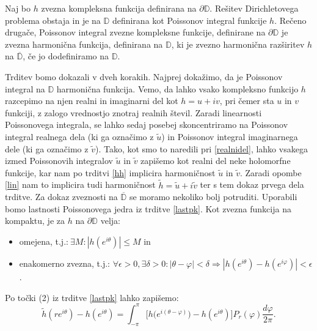 \documentclass[mat1]{fmfdelo}
\begin{document}
     \begin{trditev}
        \label{obstoj}
        Naj bo $h$ zvezna kompleksna funkcija definirana na $\partial \mathbb{D}$. Rešitev Dirichletovega problema obstaja in je na $\mathbb{D}$ definirana kot Poissonov integral funkcije $h$.
        \newline
        Rečeno drugače, Poissonov integral zvezne kompleksne funkcije, definirane na $\partial \mathbb{D}$ je zvezna harmonična funkcija, definirana na $\mathbb{D}$, ki je zvezno harmonična razširitev $h$ na $\overline{\mathbb{D}}$, če jo dodefiniramo na $\mathbb{D}$.
     \end{trditev}
     \begin{dokaz}
        Trditev bomo dokazali v dveh korakih. Najprej dokažimo, da je Poissonov integral na $\mathbb{D}$ harmonična funkcija.
        Vemo, da lahko vsako kompleksno funkcijo $h$ razcepimo na njen realni in imaginarni del kot $h = u + iv$, pri čemer sta $u$ in $v$ funkciji, z zalogo vrednostjo znotraj realnih števil. 
        Zaradi linearnosti Poissonovega integrala, se lahko sedaj posebej skoncentriramo na Poissonov integral realnega dela (ki ga označimo z $\widetilde{u}$) in Poissonov integral imaginarnega dele (ki ga označimo z $\widetilde{v}$). 
        Tako, kot smo to naredili pri \ref{realnidel}, lahko vsakega izmed Poissonovih integralov $\widetilde{u}$ in $\widetilde{v}$ zapišemo kot realni del neke holomorfne funkcije, kar nam po trditvi \ref{hh} implicira harmoničnost $\widetilde{u}$ in $\widetilde{v}$.
        Zaradi opombe \ref{lin} nam to implicira tudi harmoničnost $\widetilde{h} = \widetilde{u} + i\widetilde{v}$ ter s tem dokaz prvega dela trditve. 
        \newline
        Za dokaz zveznosti na $\overline{\mathbb{D}}$ se moramo nekoliko bolj potruditi. Uporabili bomo lastnosti Poissonovega jedra iz trditve \ref{lastpk}. 
        Kot zvezna funkcija na kompaktu, je za $h$ na $\partial \mathbb{D}$ velja: 
        \begin{itemize}
            \item omejena, t.j.:$~\exists M: |h(e^{i\theta})| \leq M$ in 
            \item enakomerno zvezna, t.j.: $\forall \epsilon > 0, \exists \delta > 0: | \theta - \varphi | < \delta \Rightarrow |h(e^{i\theta}) - h(e^{i\varphi})| < \epsilon $.
        \end{itemize}
        Po točki (2) iz trditve \ref{lastpk} lahko zapišemo:
        $$
            \widetilde{h}(re^{i\theta}) - h(e^{i\theta}) = \int_{-\pi}^{\pi}{\bigg[h\big(e^{i(\theta - \varphi)}\big) - h(e^{i\theta})\bigg]P_r(\varphi)\frac{d\varphi}{2\pi}}.
$$
\end{dokaz}
\end{document}

